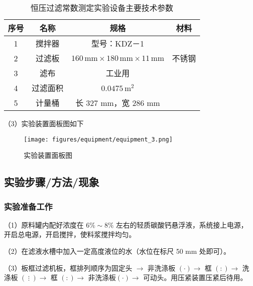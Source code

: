 \begin{table}[H]
    \centering
    \caption{恒压过滤常数测定实验设备主要技术参数}
    \label{tab:equipment_parameters}
    \settableinnerfont
    \begin{tabular}{cccc}
        \toprule
        序号 & 名称 & 规格 & 材料 \\
        \midrule
        1 & 搅拌器 & 型号：KDZ－1 & \\
        2 & 过滤板 & $160 \, \mathrm{mm} \times 180 \, \mathrm{mm} \times 11 \, \mathrm{mm}$ & 不锈钢 \\
        3 & 滤布 & 工业用 & \\
        4 & 过滤面积 & $0.0475 \, \mathrm{m}^2$ & \\
        5 & 计量桶 & 长 327 mm，宽 286 mm & \\
        \bottomrule
    \end{tabular}
\end{table}

（3）实验装置面板图如下

\begin{figure}[H]
    \centering
    \texttt{[image: figures/equipment/equipment\_3.png]}
    \caption{实验装置面板图}
    \label{fig:equipment_3}
\end{figure}


\subsection{实验步骤/方法/现象}



\subsubsection{实验准备工作}

（1）原料罐内配好浓度在 $6\% \sim 8\%$ 左右的轻质碳酸钙悬浮液，系统接上电源，开启总电源，开启搅拌，使料浆搅拌均匀。

（2）在滤液水槽中加入一定高度液位的水（水位在标尺 50 mm 处即可）。

（3）板框过滤机板，框排列顺序为固定头 $\rightarrow$ 非洗涤板 $(\cdot) 
\rightarrow$ 框 $(:) \rightarrow$ 洗涤板 $(⋮)\rightarrow$ 框 $(:) \rightarrow$ 非洗涤板$(\cdot)$$\rightarrow$ 可动头。用压紧装置压紧后待用。

